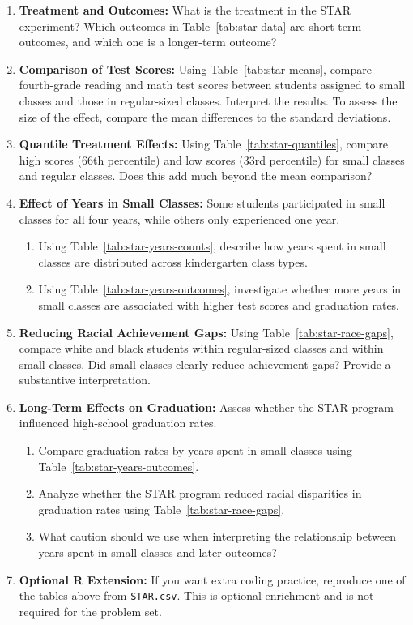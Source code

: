 \documentclass[12pt]{article}
\begin{document}
\begin{enumerate}
    \item \textbf{Treatment and Outcomes:} What is the treatment in the STAR experiment? Which outcomes in Table~\ref{tab:star-data} are short-term outcomes, and which one is a longer-term outcome?

    \item \textbf{Comparison of Test Scores:} Using Table~\ref{tab:star-means}, compare fourth-grade reading and math test scores between students assigned to small classes and those in regular-sized classes. Interpret the results. To assess the size of the effect, compare the mean differences to the standard deviations.

    \item \textbf{Quantile Treatment Effects:} Using Table~\ref{tab:star-quantiles}, compare high scores (66th percentile) and low scores (33rd percentile) for small classes and regular classes. Does this add much beyond the mean comparison?

    \item \textbf{Effect of Years in Small Classes:} Some students participated in small classes for all four years, while others only experienced one year. 
    \begin{enumerate}
        \item Using Table~\ref{tab:star-years-counts}, describe how years spent in small classes are distributed across kindergarten class types.
        \item Using Table~\ref{tab:star-years-outcomes}, investigate whether more years in small classes are associated with higher test scores and graduation rates.
    \end{enumerate}

    \item \textbf{Reducing Racial Achievement Gaps:} Using Table~\ref{tab:star-race-gaps}, compare white and black students within regular-sized classes and within small classes. Did small classes clearly reduce achievement gaps? Provide a substantive interpretation.

    \item \textbf{Long-Term Effects on Graduation:} Assess whether the STAR program influenced high-school graduation rates. 
    \begin{enumerate}
        \item Compare graduation rates by years spent in small classes using Table~\ref{tab:star-years-outcomes}.
        \item Analyze whether the STAR program reduced racial disparities in graduation rates using Table~\ref{tab:star-race-gaps}.
        \item What caution should we use when interpreting the relationship between years spent in small classes and later outcomes?
    \end{enumerate}

    \item \textbf{Optional R Extension:} If you want extra coding practice, reproduce one of the tables above from \texttt{STAR.csv}. This is optional enrichment and is not required for the problem set.
\end{enumerate}
\end{document}
